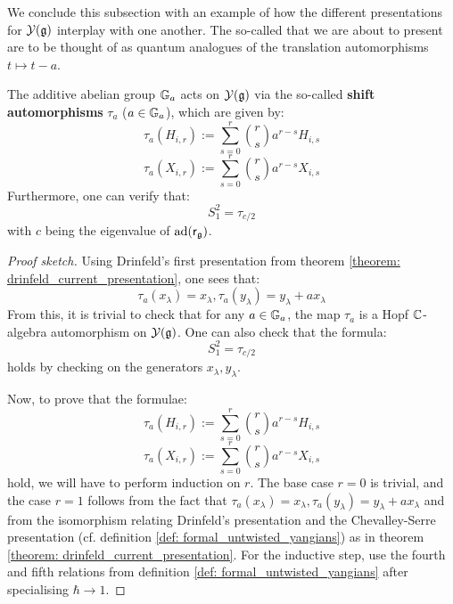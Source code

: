         We conclude this subsection with an example of how the different presentations for $\mathcal{Y}(\mathfrak{g})$ interplay with one another. The so-called  that we are about to present are to be thought of as quantum analogues of the translation automorphisms $t \mapsto t - a$.
        \begin{proposition} \label{prop: untwisted_yangians_shift_automorphisms}
            \cite[Proposition 12.1.5]{chari_pressley_quantum_groups} The additive abelian group $\mathbb{G}_a$ acts on $\mathcal{Y}(\mathfrak{g})$ via the so-called \textbf{shift automorphisms} $\tau_a$ ($a \in \mathbb{G}_a$), which are given by:
                $$\tau_a(H_{i, r}) := \sum_{s = 0}^r \binom{r}{s} a^{r - s} H_{i, s}$$
                $$\tau_a(X_{i, r}) := \sum_{s = 0}^r \binom{r}{s} a^{r - s} X_{i, s}$$
            Furthermore, one can verify that:
                $$S_1^2 = \tau_{c/2}$$
            with $c$ being the eigenvalue of $\mathrm{ad}(\mathsf{r}_{\mathfrak{g}})$.
        \end{proposition}
            \begin{proof}[Proof sketch]
                Using Drinfeld's first presentation from theorem \ref{theorem: drinfeld_current_presentation}, one sees that:
                    $$\tau_a(x_{\lambda}) = x_{\lambda}, \tau_a(y_{\lambda}) = y_{\lambda} + a x_{\lambda}$$
                From this, it is trivial to check that for any $a \in \mathbb{G}_a$, the map $\tau_a$ is a Hopf $\mathbb{C}$-algebra automorphism on $\mathcal{Y}(\mathfrak{g})$. One can also check that the formula:
                    $$S_1^2 = \tau_{c/2}$$
                holds by checking on the generators $x_{\lambda}, y_{\lambda}$. 

                Now, to prove that the formulae:
                    $$\tau_a(H_{i, r}) := \sum_{s = 0}^r \binom{r}{s} a^{r - s} H_{i, s}$$
                    $$\tau_a(X_{i, r}) := \sum_{s = 0}^r \binom{r}{s} a^{r - s} X_{i, s}$$
                hold, we will have to perform induction on $r$. The base case $r = 0$ is trivial, and the case $r = 1$ follows from the fact that $\tau_a(x_{\lambda}) = x_{\lambda}, \tau_a(y_{\lambda}) = y_{\lambda} + a x_{\lambda}$ and from the isomorphism relating Drinfeld's presentation and the Chevalley-Serre presentation (cf. definition \ref{def: formal_untwisted_yangians}) as in theorem \ref{theorem: drinfeld_current_presentation}. For the inductive step, use the fourth and fifth relations from definition \ref{def: formal_untwisted_yangians} after specialising $\hbar \to 1$. 
            \end{proof}

